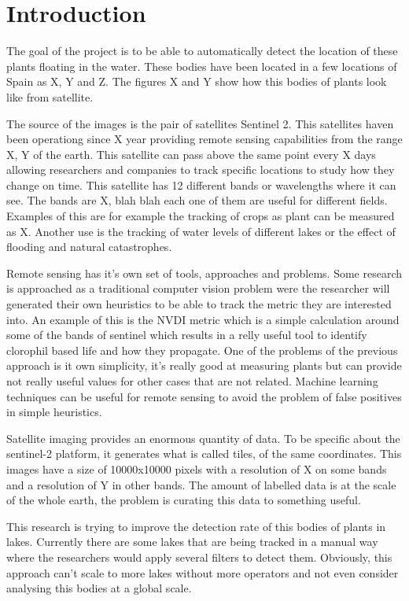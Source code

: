 \documentclass[conference]{IEEEtran}
\begin{document}
    \section{Introduction}
    The goal of the project is to be able to automatically detect the location of these plants
    floating in the water.
    These bodies have been located in a few locations of Spain as X, Y and Z. The figures X and Y
    show how this bodies of plants look like from satellite.

    The source of the images is the pair of satellites Sentinel 2. This satellites haven been operationg since X year
    providing remote sensing capabilities from the range X, Y of the earth.
    This satellite can pass above the same point every X days allowing researchers and companies to
    track specific locations to study how they change on time.
    This satellite has 12 different bands or wavelengths where it can see. The bands are X, blah blah
    each one of them are useful for different fields.
    Examples of this are for example the tracking of crops as plant can be measured as X.
    Another use is the tracking of water levels of different lakes or the effect of flooding and
    natural catastrophes.

    Remote sensing has it's own set of tools, approaches and problems.
    Some research is approached as a traditional computer vision problem were the researcher will
    generated their own heuristics to be able to track the metric they are interested into.
    An example of this is the NVDI metric which is a simple calculation around some of the bands of
    sentinel which results in a relly useful tool to identify clorophil based life and how they
    propagate.
    One of the problems of the previous approach is it own simplicity, it's really good at measuring
    plants but can provide not really useful values for other cases that are not related.
    Machine learning techniques can be useful for remote sensing to avoid the problem of false
    positives in simple heuristics.

    Satellite imaging provides an enormous quantity of data.
    To be specific about the sentinel-2 platform, it generates what is called tiles, of the same coordinates. This
    images have a size of 10000x10000 pixels with a resolution of X on some bands and a resolution of Y in other bands.
    The amount of labelled data is at the scale of the whole earth, the problem is curating this
    data to something useful.

    This research is trying to improve the detection rate of this bodies of plants in lakes.
    Currently there are some lakes that are being tracked in a manual way where the researchers
    would apply several filters to detect them.
    Obviously, this approach can't scale to more lakes without more operators and not even consider analysing this
    bodies at a global scale.
\end{document}
